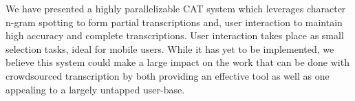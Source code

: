 \documentclass[conference]{IEEEtran}
\begin{document}
We have presented a highly parallelizable CAT system which leverages character n-gram spotting to form partial transcriptions and, user interaction to maintain high accuracy and complete transcriptions. User interaction takes place as small selection tasks, ideal for mobile users. While it has yet to be implemented, we believe this system could make a large impact on the work that can be done with crowdsourced transcription by both providing an effective tool as well as one appealing to a largely untapped user-base.











%
%






\end{document}
